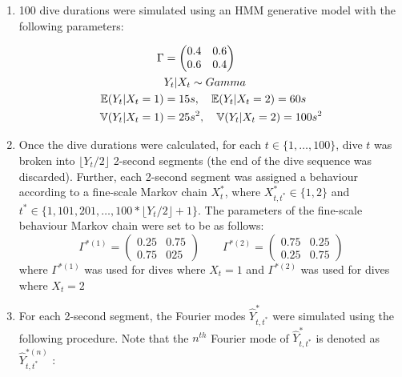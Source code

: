 \begin{enumerate}
	\item 100 dive durations were simulated using an HMM generative model with the following parameters:
	
	\begin{align*}
		\Gamma &= \begin{pmatrix} 0.4 & 0.6 \\ 0.6 & 0.4 \end{pmatrix} \\
		&Y_t|X_t \sim Gamma \\
		\mathbb{E}(Y_t|X_t = 1) &= 15 s, \quad \mathbb{E}(Y_t|X_t = 2) = 60 s \\
		\mathbb{V}(Y_t|X_t = 1) &= 25 s^2, \quad \mathbb{V}(Y_t|X_t = 2) = 100 s^2
	\end{align*}
	
	\item Once the dive durations were calculated, for each $t \in \{1, \ldots, 100\}$, dive $t$ was broken into $\lfloor Y_t/2 \rfloor$ 2-second segments (the end of the dive sequence was discarded). Further, each 2-second segment was assigned a behaviour according to a fine-scale Markov chain $X^*_t$, where $X^*_{t,t^*} \in \{1,2\}$ and $t^* \in \{1,101,201,\ldots,100*\lfloor Y_t/2 \rfloor + 1\}$. The parameters of the fine-scale behaviour Markov chain were set to be as follows:
	$$\Gamma^{*(1)} = \begin{pmatrix} 0.25 & 0.75 \\ 0.75 & 025 \end{pmatrix} \qquad 	\Gamma^{*(2)} = \begin{pmatrix} 0.75 & 0.25 \\ 0.25 & 0.75 \end{pmatrix}$$
	where $\Gamma^{*(1)}$ was used for dives where $X_t = 1$ and $\Gamma^{*(2)}$ was used for dives where $X_t = 2$
	
	\item For each 2-second segment, the Fourier modes $\hat{Y}^*_{t,t^*}$ were simulated using the following procedure. Note that the $n^{th}$ Fourier mode of $\hat{Y}^*_{t,t^*}$ is denoted as $\hat{Y}^{*(n)}_{t,t^*}$ :
	

\end{enumerate}

